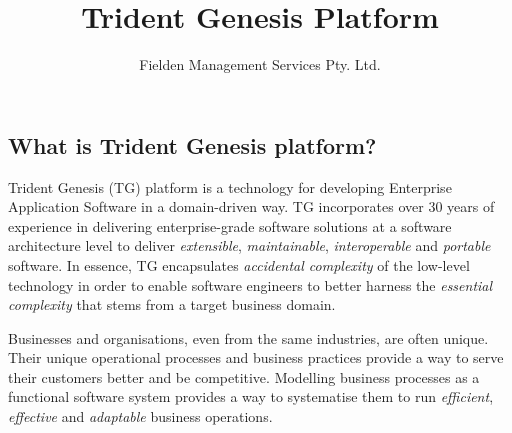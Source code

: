 \documentclass[a4paper,10pt,twocolumn,oneside,openright,final]{memoir}
\title{Trident Genesis Platform}
\author{Fielden Management Services Pty. Ltd.}
\begin{document}

\subsection*{What is Trident Genesis platform?}
  Trident Genesis (TG) platform is a technology for developing Enterprise Application Software in a domain-driven way.
  TG incorporates over 30 years of experience in delivering enterprise-grade software solutions at a software architecture level to deliver \emph{extensible}, \emph{maintainable}, \emph{interoperable} and \emph{portable} software.
  In essence, TG encapsulates \emph{accidental complexity} of the low-level technology in order to enable software engineers to better harness the
  \emph{essential complexity} that stems from a target business domain.

  \vspace{3 mm}
  \noindent Businesses and organisations, even from the same industries, are often unique.
  Their unique operational processes and business practices provide a way to serve their customers better and be competitive.
  Modelling business processes as a functional software system provides a way to systematise them to run \emph{efficient}, \emph{effective} and \emph{adaptable} business operations.

\begin{figure}[!h]
    \vspace{-5pt}
    \centering
    \vspace{0pt}
  \end{figure}
\end{document}
